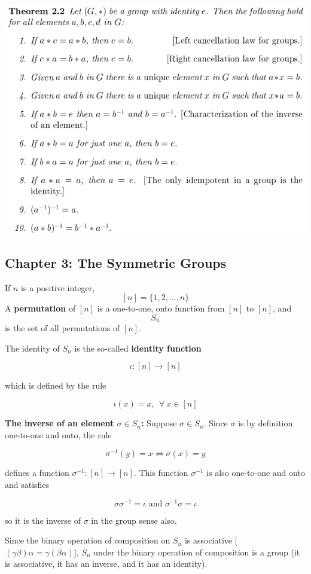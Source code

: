 \documentclass{article}
\begin{document}
\includegraphics[scale=0.45]{group_properties}

\pagebreak
\subsection{Chapter 3: The Symmetric Groups}

If \(n\) is a positive integer, \[[n] = \{ 1, 2, \ldots, n \} \] A \textbf{permutation} of \([n]\) is a one-to-one, onto function from \([n]\) to \([n]\), and \[S_n\] is the set of all permutations of \([n]\).

The identity of \(S_n\) is the so-called \textbf{identity function}

\[
\iota : [n] \to [n]
\]

which is defined by the rule

\[
\iota(x) = x, \ \ \forall \ x \in [n]
\]

\textbf{The inverse of an element \(\sigma \in S_n\):} Suppose \(\sigma \in S_n\). Since \(\sigma\) is by definition one-to-one and onto, the rule

\[
\sigma^{-1}(y) = x \iff \sigma(x) = y
\]

defines a function \(\sigma^{-1}: [n] \to [n]\). This function \(\sigma^{-1}\) is also one-to-one and onto and satisfies

\[
\sigma \sigma^{-1} = \iota \text{       and         } \sigma^{-1}\sigma = \iota
\]

so it is the inverse of \(\sigma\) in the group sense also.

Since the binary operation of composition on \(S_n\) is associative [\(  (\gamma \beta) \alpha = \gamma (\beta \alpha)  \)], \(S_n\) under the binary operation of composition is a group (it is associative, it has an inverse, and it has an identity).
\end{document}

